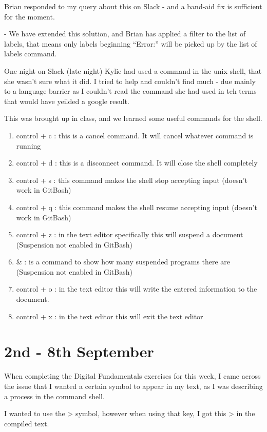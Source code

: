 \documentclass{article}
\begin{document}
Brian responded to my query about this on Slack - and a band-aid fix is sufficient for the moment.

- We have extended this solution, and Brian has applied a filter to the list of labels, that means only labels beginning ``Error:'' will be picked up by the list of labels command. 

\label{Error: Ctrl + foo in Unix Shell}

One night on Slack (late night) Kylie had used a command in the unix shell, that she wasn't sure what it did. I tried to help and couldn't find much - due mainly to a language barrier as I couldn't read the command she had used in teh terms that would have yeilded a google result.

This was brought up in class, and we learned some useful commands for the shell. 
\begin{enumerate}
    \item control + c : this is a cancel command. It will cancel whatever command is running
    \item  control + d : this is a disconnect command. It will close the shell completely
    \item  control + s : this command makes the shell stop accepting input (doesn't work in GitBash)
    \item  control + q : this command makes the shell resume accepting input (doesn't work in GitBash)
    \item  control + z : in the text editor specifically this will suspend a document (Suspension not enabled in GitBash)
    \item \& : is a command to show how many suspended programs there are (Suspension not enabled in GitBash)
    \item control + o : in the text editor this will write the entered information to the document.
    \item control + x : in the text editor this will exit the text editor
\end{enumerate}
    
\section{2nd - 8th September}
\label{Error: LaTeX and Symbols}
When completing the Digital Fundamentals exercises for this week, I came across the issue that I wanted a certain symbol to appear in my text, as I was describing a process in the command shell. 

I wanted to use the \textgreater{} symbol, however when using that key, I got this > in the compiled text. 
\end{document}
